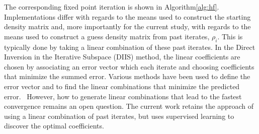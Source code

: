 \documentclass[twoside,11pt]{article}
\begin{document}
The corresponding fixed point iteration is shown in Algorithm\ref{alg:hf}. Implementations differ with regards to the means used to construct the starting density matrix and, more importantly for the current study, with regards to the means used to construct a guess density matrix from past iterates, $\rho_i$. This is typically done by taking a linear combination of these past iterates. In the Direct Inversion in the Iterative Subspace (DIIS) method\citep{Pulay1980}, the linear coefficients are chosen by associating an error vector which each iterate and choosing coefficients that minimize the summed error. Various methods have been used to define the error vector and to find the linear combinations that minimize the predicted error.~\citep{ADIIS,compScuseria,Alejandro2012} However, how to generate linear combinations that lead to the fastest convergence remains an open question\citep{Konstantin2002, Thorsten2011}. The current work retains the approach of using a linear combination of past iterates, but uses supervised learning to discover the optimal coefficients. 



\end{document}
